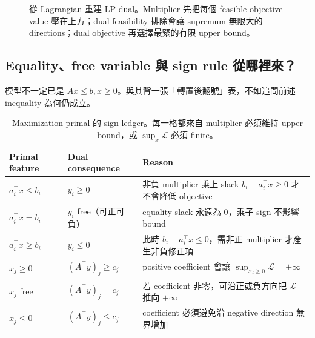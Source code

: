 \documentclass[11pt,a4paper,oneside,openany]{book}
\begin{document}
\begin{figure}[htbp]
\centering
{}
\caption{從 Lagrangian 重建 LP dual。Multiplier 先把每個 feasible objective value 壓在上方；dual feasibility 排除會讓 supremum 無限大的 directions；dual objective 再選擇最緊的有限 upper bound。}
\label{fig:lagrangian-dual}
\end{figure}

\subsection{Equality、free variable 與 sign rule 從哪裡來？}
模型不一定已是 $Ax\le b,x\ge0$。與其背一張「轉置後翻號」表，不如追問前述 inequality 為何仍成立。
\begin{table}[htbp]
\centering
\caption{Maximization primal 的 sign ledger。每一格都來自 multiplier 必須維持 upper bound，或 $\sup_x\mathcal L$ 必須 finite。}
\label{tab:dual-sign-ledger}
\begin{tabularx}{.94\textwidth}{@{}YY Y@{}}
\toprule
Primal feature & Dual consequence & Reason \\
\midrule
$a_i^\top x\le b_i$
  & $y_i\ge0$
  & 非負 multiplier 乘上 slack $b_i-a_i^\top x\ge0$ 才不會降低 objective \\
$a_i^\top x=b_i$
  & $y_i$ free（可正可負）
  & equality slack 永遠為 0，乘子 sign 不影響 bound \\
$a_i^\top x\ge b_i$
  & $y_i\le0$
  & 此時 $b_i-a_i^\top x\le0$，需非正 multiplier 才產生非負修正項 \\
$x_j\ge0$
  & $(A^\top y)_j\ge c_j$
  & positive coefficient 會讓 $\sup_{x_j\ge0}\mathcal L=+\infty$ \\
$x_j$ free
  & $(A^\top y)_j=c_j$
  & 若 coefficient 非零，可沿正或負方向把 $\mathcal L$ 推向 $+\infty$ \\
$x_j\le0$
  & $(A^\top y)_j\le c_j$
  & coefficient 必須避免沿 negative direction 無界增加 \\
\bottomrule
\end{tabularx}
\end{table}
\end{document}
